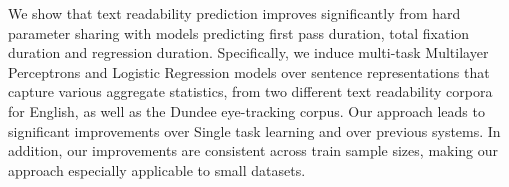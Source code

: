 We show that text readability prediction improves significantly from hard parameter sharing with models predicting first pass duration, total fixation duration and regression duration. Specifically, we induce multi-task Multilayer Perceptrons and Logistic Regression models over sentence representations that capture various aggregate statistics, from two different text readability corpora for English, as well as the Dundee eye-tracking corpus. Our approach leads to significant improvements over Single task learning and over previous systems. In addition, our improvements are consistent across train sample sizes, making our approach especially applicable to small datasets.
